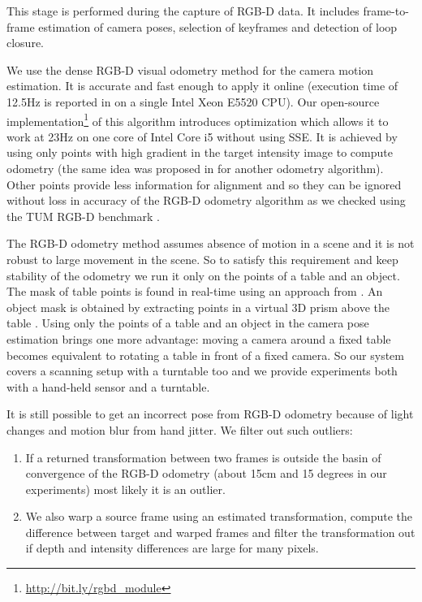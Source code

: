 \documentclass[letterpaper, 10 pt, conference]{ieeeconf}  %
\begin{document}
This stage is performed during the capture of RGB-D data. It includes
frame-to-frame estimation of camera poses, selection of keyframes and 
detection of loop closure.

We use the dense RGB-D visual odometry
method \cite{steinbrucker2011real} for the camera motion estimation.
It is accurate and fast enough to apply it online
(execution time of 12.5Hz is reported in \cite{steinbrucker2011real}
on a single Intel Xeon E5520 CPU).
Our open-source implementation\footnote{\label{note1}\href{http://bit.ly/rgbd\_module}{http://bit.ly/rgbd\_module}} of this algorithm
introduces optimization which allows it to work at 23Hz on one core
of Intel Core i5 without using SSE.
It is achieved by using only points with high gradient in the target intensity image
to compute odometry (the same idea was proposed in \cite{tykkala2011direct} for another odometry algorithm).
Other points provide less information for alignment
and so they can be ignored without loss in accuracy of the RGB-D odometry algorithm
as we checked using the TUM RGB-D benchmark \cite{sturm12iros}.

The RGB-D odometry method assumes absence of motion in a scene and it is not
robust to large movement in the scene. So to satisfy this requirement
and keep stability of the odometry we run it only
on the points of a table and an object. The mask of table points
is found in real-time using an approach from \cite{poppinga2008fast}. An object mask is
obtained by extracting points in a virtual 3D prism above the table \cite{rusu2009detecting}.
Using only the points
of a table and an object in the camera pose estimation brings one more advantage:
moving a camera around a fixed table becomes equivalent to rotating
a table in front of a fixed camera. So our system covers a scanning setup with a turntable too
and we provide experiments both with a hand-held sensor and a turntable.

It is still possible to get an incorrect pose from RGB-D odometry
because of light changes and motion blur from hand jitter.
We filter out such outliers:

\begin{enumerate}
 \item If a returned transformation between two frames is outside the basin of convergence
 of the RGB-D odometry (about 15cm and 15 degrees in our experiments) most likely it is an outlier.
 \item We also warp a source frame using an estimated transformation,
 compute the difference between target and warped frames 
 and filter the transformation out if
 depth and intensity differences are large for many pixels.
\end{enumerate}
\end{document}
